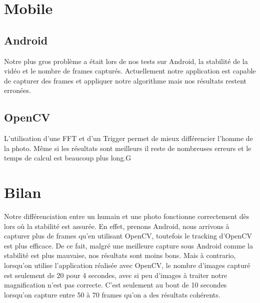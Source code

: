 \section{Mobile}

\subsection{Android}

Notre plus gros problème a était lors de nos tests sur Android, la stabilité de la vidéo et le nombre de frames capturés.
Actuellement notre application est capable de capturer des frames et appliquer notre algorithme mais nos résultats restent erronées.

\subsection{OpenCV}
	L'utilisation d'une FFT et d'un Trigger permet de mieux différencier l'homme de la photo. Même si les résultats sont meilleurs il reste de nombreuses erreurs et le temps de calcul est beaucoup plus long.G

\section{Bilan}

Notre différenciation entre un humain et une photo fonctionne correctement dès lors où la stabilité est assurée. En effet, prenons Android, nous arrivons
à capturer plus de frames qu'en utilisant OpenCV, toutefois le tracking d'OpenCV est plus efficace. De ce fait, malgré une meilleure capture sous Android 
comme la stabilité est plus mauvaise, nos résultats sont moins bons. Mais à contrario, lorsqu'on utilise l'application réalisée avec OpenCV, le nombre d'images
capturé est seulement de 20 pour 4 secondes, avec si peu d'images à traiter notre magnification n'est pas correcte. C'est seulement au bout de 10 secondes
lorsqu'on capture entre 50 à 70 frames qu'on a des résultats cohérents. 

